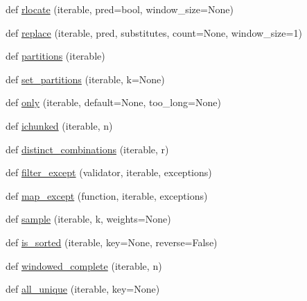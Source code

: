 \begin{DoxyCompactItemize}
\item 
def \hyperlink{namespacesetuptools_1_1__vendor_1_1more__itertools_1_1more_a7e085bda06138f196912d6300bf70753}{rlocate} (iterable, pred=bool, window\+\_\+size=None)
\item 
def \hyperlink{namespacesetuptools_1_1__vendor_1_1more__itertools_1_1more_a11b819d5b236ecfc8d5ef96808e0f6ff}{replace} (iterable, pred, substitutes, count=None, window\+\_\+size=1)
\item 
def \hyperlink{namespacesetuptools_1_1__vendor_1_1more__itertools_1_1more_aff68c3cfb337e2d85ce1f65b4a7ac344}{partitions} (iterable)
\item 
def \hyperlink{namespacesetuptools_1_1__vendor_1_1more__itertools_1_1more_a3dfbf02981a97829237b11c914dad981}{set\+\_\+partitions} (iterable, k=None)
\item 
def \hyperlink{namespacesetuptools_1_1__vendor_1_1more__itertools_1_1more_a1d62053e712ee970aacc4abfcf953bd6}{only} (iterable, default=None, too\+\_\+long=None)
\item 
def \hyperlink{namespacesetuptools_1_1__vendor_1_1more__itertools_1_1more_a1bf1536200cc78d82b5aa239e89f8770}{ichunked} (iterable, n)
\item 
def \hyperlink{namespacesetuptools_1_1__vendor_1_1more__itertools_1_1more_a3825558c5c1fde62db5c724bcbb3de04}{distinct\+\_\+combinations} (iterable, r)
\item 
def \hyperlink{namespacesetuptools_1_1__vendor_1_1more__itertools_1_1more_a802b5d5b5f40739f916923c05e859072}{filter\+\_\+except} (validator, iterable, exceptions)
\item 
def \hyperlink{namespacesetuptools_1_1__vendor_1_1more__itertools_1_1more_ad478e8a78a411590fd37e19d6ba21861}{map\+\_\+except} (function, iterable, exceptions)
\item 
def \hyperlink{namespacesetuptools_1_1__vendor_1_1more__itertools_1_1more_a91548632a1b9f5d55b2a9b6a7783fd5e}{sample} (iterable, k, weights=None)
\item 
def \hyperlink{namespacesetuptools_1_1__vendor_1_1more__itertools_1_1more_a8484d2cdc91ee314431550f3abc9a3bc}{is\+\_\+sorted} (iterable, key=None, reverse=False)
\item 
def \hyperlink{namespacesetuptools_1_1__vendor_1_1more__itertools_1_1more_a0a9494bd8a93efcf205854f97da47518}{windowed\+\_\+complete} (iterable, n)
\item 
def \hyperlink{namespacesetuptools_1_1__vendor_1_1more__itertools_1_1more_a10d89d566c65810a4d60b21e990af600}{all\+\_\+unique} (iterable, key=None)

\end{DoxyCompactItemize}
